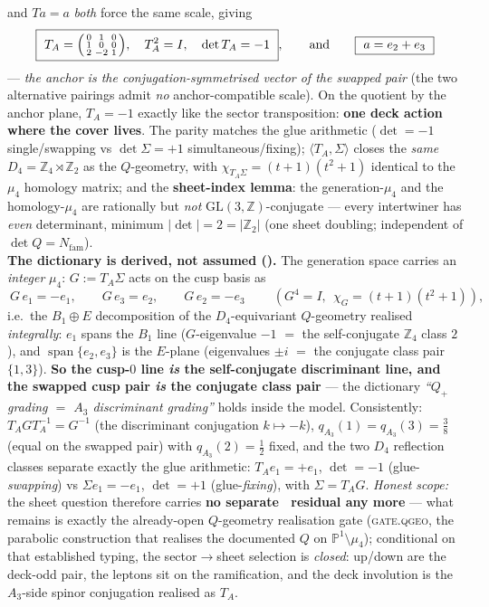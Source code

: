 \documentclass[11pt,a4paper]{article}
\newcommand{\Nfam}{N_{\mathrm{fam}}}
\newcommand{\PP}{\mathbb{P}}
\newcommand{\Z}{\mathbb{Z}}
\theoremstyle{definition}
\begin{document}
\begin{keybox}
and $Ta=a$ \emph{both} force the same scale, giving
\[
  \boxed{\ T_A=\begin{psmallmatrix}0&1&0\\1&0&0\\2&-2&1\end{psmallmatrix},\quad T_A^2=I,\quad\det T_A=-1\ },
  \qquad\text{and}\qquad \boxed{\ a=e_2+e_3\ }
\]
--- \emph{the anchor is the conjugation-symmetrised vector of the swapped pair} (the two alternative
pairings admit \emph{no} anchor-compatible scale). On the quotient by the anchor plane, $T_A=-1$ exactly
like the sector transposition: \textbf{one deck action where the cover lives}. The parity matches the glue
arithmetic ($\det=-1$ single/swapping vs $\det\Sigma=+1$ simultaneous/fixing); $\langle T_A,\Sigma\rangle$
closes the \emph{same} $D_4=\Z_4\rtimes\Z_2$ as the $Q$-geometry, with $\chi_{T_A\Sigma}=(t{+}1)(t^2{+}1)$
identical to the $\mu_4$ homology matrix; and the \textbf{sheet-index lemma}: the generation-$\mu_4$ and the
homology-$\mu_4$ are rationally but \emph{not} $\mathrm{GL}(3,\Z)$-conjugate --- every intertwiner has
\emph{even} determinant, minimum $|\det|=2=|\Z_2|$ (one sheet doubling; independent of $\det Q=\Nfam$).
\smallskip\\
\noindent\textbf{The dictionary is derived, not assumed ().}
The generation space carries an \emph{integer} $\mu_4$: $G:=T_A\Sigma$ acts on the cusp basis as
\[
  \boxed{\ G\,e_1=-e_1,\qquad G\,e_3=e_2,\qquad G\,e_2=-e_3\ }\qquad
  (G^4=I,\ \ \chi_G=(t{+}1)(t^2{+}1)),
\]
i.e.\ the $B_1\!\oplus\!E$ decomposition of the $D_4$-equivariant $Q$-geometry realised \emph{integrally}:
$e_1$ spans the $B_1$ line ($G$-eigenvalue $-1$ $=$ the self-conjugate $\Z_4$ class $2$), and
$\operatorname{span}\{e_2,e_3\}$ is the $E$-plane (eigenvalues $\pm i$ $=$ the conjugate class pair
$\{1,3\}$). \textbf{So the cusp-$0$ line \emph{is} the self-conjugate discriminant line, and the swapped
cusp pair \emph{is} the conjugate class pair} --- the dictionary \emph{``$Q_+$ grading $=$ $A_3$
discriminant grading''} holds inside the model. Consistently: $T_A G T_A^{-1}=G^{-1}$ (the discriminant
conjugation $k\mapsto-k$), $q_{A_3}(1)=q_{A_3}(3)=\tfrac38$ (equal on the swapped pair) with
$q_{A_3}(2)=\tfrac12$ fixed, and the two $D_4$ reflection classes separate exactly the glue arithmetic:
$T_Ae_1=+e_1$, $\det=-1$ (glue-\emph{swapping}) vs $\Sigma e_1=-e_1$, $\det=+1$ (glue-\emph{fixing}),
with $\Sigma=T_AG$. \emph{Honest scope:} the sheet question therefore carries \textbf{no separate \mC\
residual any more} --- what remains is exactly the already-open $Q$-geometry realisation gate
(\textsc{gate.qgeo}, the parabolic construction that realises the documented $Q$ on
$\PP^1\!\setminus\!\mu_4$); conditional on that established typing, the sector$\to$sheet selection is
\emph{closed}: up/down are the deck-odd pair, the leptons sit on the ramification, and the deck involution
is the $A_3$-side spinor conjugation realised as $T_A$.
\end{keybox}
\end{document}

